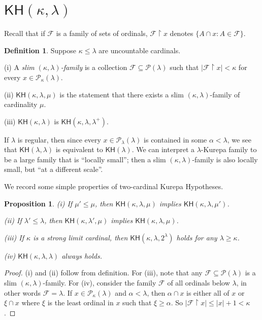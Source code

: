 \documentclass[10pt,reqno]{amsart}
\theoremstyle{plain}
\newtheorem{proposition}[theorem]{Proposition}
\theoremstyle{definition}
\newtheorem{definition}[theorem]{Definition}
\theoremstyle{remark}
\begin{document}
\section{$\mathsf{KH}(\kappa,\lambda)$}

Recall that if $\mathcal{F}$ is a family of sets of ordinals, $\mathcal{F}\upharpoonright x$ denotes $\{A\cap x:A\in \mathcal{F}\}$.

\begin{definition}
Suppose $\kappa\leq\lambda$ are uncountable cardinals.

(i) A \textit{slim $(\kappa,\lambda)$-family} is a collection $\mathcal{F}\subseteq\mathcal{P}(\lambda)$ such that $|\mathcal{F}\upharpoonright x|<\kappa$ for every $x\in\mathcal{P}_\kappa(\lambda)$.

(ii) $\mathsf{KH}(\kappa,\lambda,\mu)$ is the statement that there exists a slim $(\kappa,\lambda)$-family of cardinality $\mu$.

(iii) $\mathsf{KH}(\kappa,\lambda)$ is $\mathsf{KH}(\kappa,\lambda,\lambda^+)$.
\end{definition}

If $\lambda$ is regular, then since every $x\in\mathcal{P}_\lambda(\lambda)$ is contained in some $\alpha<\lambda$, we see that $\mathsf{KH}(\lambda,\lambda)$ is equivalent to $\mathsf{KH}(\lambda)$. We can interpret a $\lambda$-Kurepa family to be a large family that is ``locally small''; then a slim $(\kappa,\lambda)$-family is also locally small, but ``at a different scale''.

We record some simple properties of two-cardinal Kurepa Hypotheses.

\begin{proposition}
(i) If $\mu'\leq\mu$, then $\mathsf{KH}(\kappa,\lambda,\mu)$ implies $\mathsf{KH}(\kappa,\lambda,\mu')$.

(ii) If $\lambda'\leq\lambda$, then $\mathsf{KH}(\kappa,\lambda',\mu)$ implies $\mathsf{KH}(\kappa,\lambda,\mu)$.

(iii) If $\kappa$ is a strong limit cardinal, then $\mathsf{KH}(\kappa,\lambda,2^\lambda)$ holds for any $\lambda\geq\kappa$.

(iv) $\mathsf{KH}(\kappa,\lambda,\lambda)$ always holds.
\end{proposition}
\begin{proof}
(i) and (ii) follow from definition. For (iii), note that any $\mathcal{F}\subseteq\mathcal{P}(\lambda)$ is a slim $(\kappa,\lambda)$-family. For (iv), consider the family $\mathcal{F}$ of all ordinals below $\lambda$, in other words $\mathcal{F}=\lambda$. If $x\in\mathcal{P}_\kappa(\lambda)$ and $\alpha<\lambda$, then $\alpha\cap x$ is either all of $x$ or $\xi\cap x$ where $\xi$ is the least ordinal in $x$ such that $\xi\geq\alpha$. So $|\mathcal{F}\upharpoonright x|\leq|x|+1<\kappa$.
\end{proof}
\end{document}
